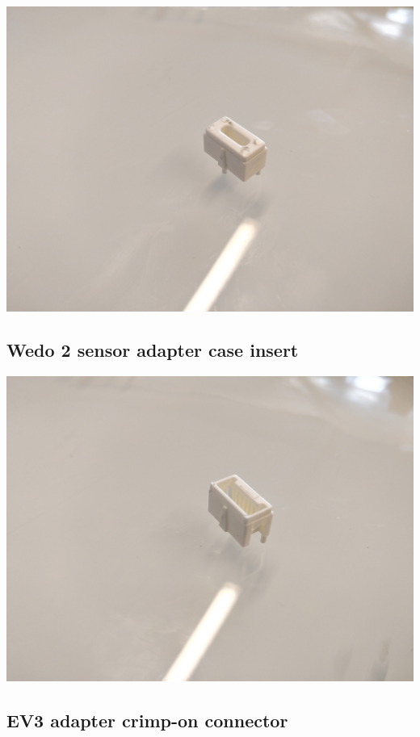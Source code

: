 \documentclass[a4paper,12pt]{article}
\begin{document}
\includegraphics[width=13.5cm]{ev3-sensor-plastic-insert.jpg}

\subsection{Wedo 2 sensor adapter case insert}

\includegraphics[width=13.5cm]{wedo2-sensor-plastic-insert.jpg}

\subsection{EV3 adapter crimp-on connector}
\end{document}
